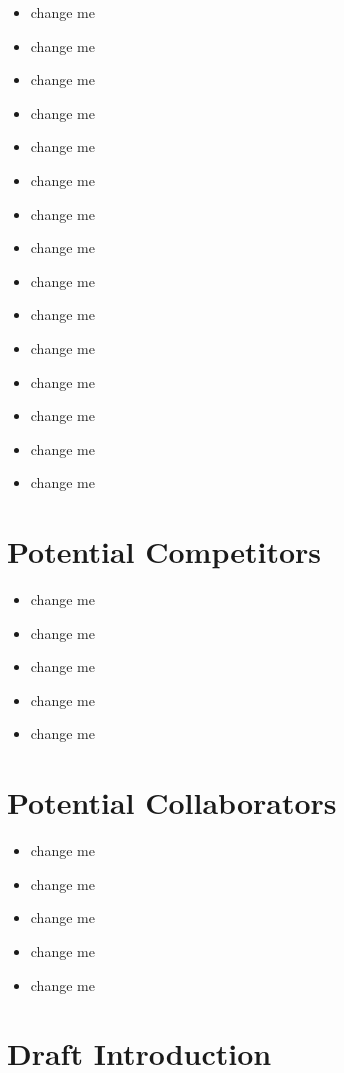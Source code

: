 \documentclass[10pt,letterpaper]{article}
\begin{document}
\begin{itemize}
\begin{itemize}
\begin{itemize}
  \item change me
  \item change me
  \item change me
  \item change me
  \item change me
  \item change me
  \item change me
  \item change me
  \item change me
  \item change me
  \item change me
  \item change me
  \item change me
  \item change me
  \item change me
\end{itemize}


\section{Potential Competitors}


\begin{itemize}
  \item change me
  \item change me
  \item change me
  \item change me
  \item change me
\end{itemize}



\section{Potential Collaborators}


\begin{itemize}
  \item change me
  \item change me
  \item change me
  \item change me
  \item change me
\end{itemize}



\section{Draft Introduction}


\end{itemize}
\end{itemize}
\end{document}
